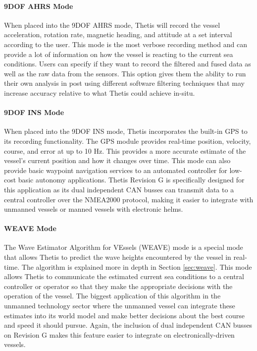 \paragraph*{9DOF AHRS Mode} When placed into the 9DOF AHRS mode, Thetis will record the vessel acceleration, rotation rate, magnetic heading, and attitude at a set interval according to the user.
This mode is the most verbose recording method and can provide a lot of information on how the vessel is reacting to the current sea conditions. 
Users can specify if they want to record the filtered and fused data as well as the raw data from the sensors.
This option gives them the ability to run their own analysis in post using different software filtering techniques that may increase accuracy relative to what Thetis could achieve in-situ.

\paragraph*{9DOF INS Mode} When placed into the 9DOF INS mode, Thetis incorporates the built-in GPS to its recording functionality.
The GPS module provides real-time position, velocity, course, and error at up to 10 Hz.
This provides a more accurate estimate of the vessel's current position and how it changes over time.
This mode can also provide basic waypoint navigation services to an automated controller for low-cost basic autonomy applications.
Thetis Revision G is specifically designed for this application as its dual independent CAN busses can transmit data to a central controller over the NMEA2000 protocol, making it easier to integrate with unmanned vessels or manned vessels with electronic helms.

\paragraph*{WEAVE Mode} The Wave Estimator Algorithm for VEssels (WEAVE) mode is a special mode that allows Thetis to predict the wave heights encountered by the vessel in real-time.
The algorithm is explained more in depth in Section \ref{sec:weave}.
This mode allows Thetis to communicate the estimated current sea conditions to a central controller or operator so that they make the appropriate decisions with the operation of the vessel.
The biggest application of this algorithm in the unmanned technology sector where the unmanned vessel can integrate these estimates into its world model and make better decisions about the best course and speed it should pursue.
Again, the inclusion of dual independent CAN busses on Revision G makes this feature easier to integrate on electronically-driven vessels.

